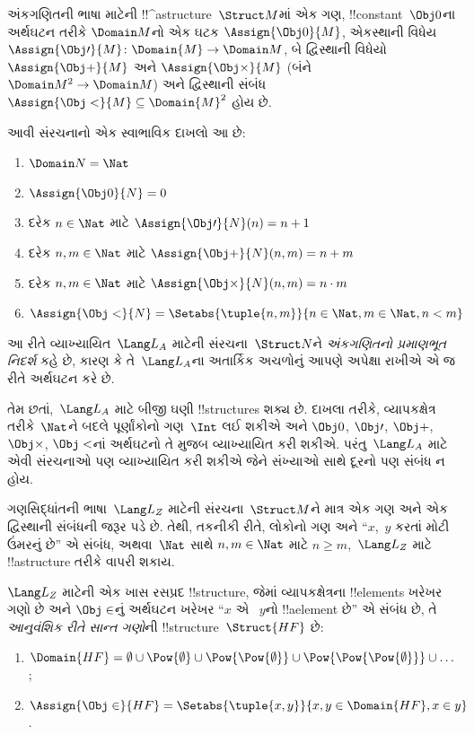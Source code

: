 \documentclass[../../../include/open-logic-section]{subfiles}
\begin{document}
\begin{ex}
અંકગણિતની ભાષા માટેની !!^a{structure}~$\Struct M$માં એક ગણ,
!!{constant}~$\Obj 0$ના અર્થઘટન તરીકે $\Domain M$નો એક ઘટક
$\Assign{\Obj 0}{M}$, એકસ્થાની વિધેય
$\Assign{\Obj \prime}{M} \colon \Domain{M} \to \Domain M$, બે
દ્વિસ્થાની વિધેયો $\Assign{\Obj +}{M}$ અને $\Assign{\Obj
  \times}{M}$ (બંને $\Domain M^2 \to \Domain M$) અને દ્વિસ્થાની
સંબંધ $\Assign{\Obj <}{M} \subseteq \Domain{M}^2$ હોય છે.

આવી સંરચનાનો એક સ્વાભાવિક દાખલો આ છે:
\begin{enumerate}
\item $\Domain N = \Nat$
\item $\Assign{\Obj 0}{N} = 0$
\item દરેક $n \in \Nat$ માટે $\Assign{\Obj \prime}{N}(n) = n + 1$
\item દરેક $n, m \in \Nat$ માટે $\Assign{\Obj +}{N}(n, m) = n + m$
\item દરેક $n, m \in \Nat$ માટે $\Assign{\Obj \times}{N}(n, m) = n\cdot m$
\item $\Assign{\Obj <}{N} = \Setabs{\tuple{n, m}}{n \in \Nat, m \in
  \Nat, n < m}$
\end{enumerate}
આ રીતે વ્યાખ્યાયિત~$\Lang L_A$ માટેની સંરચના~$\Struct N$ને
\emph{અંકગણિતનો પ્રમાણભૂત નિદર્શ} કહે છે, કારણ કે તે~$\Lang L_A$ના
અતાર્કિક અચળોનું આપણે અપેક્ષા રાખીએ એ જ રીતે અર્થઘટન કરે છે.

તેમ છતાં,~$\Lang L_A$ માટે બીજી ઘણી !!{structure}s શક્ય છે. દાખલા
તરીકે, વ્યાપકક્ષેત્ર તરીકે~$\Nat$ને બદલે પૂર્ણાંકોનો ગણ~$\Int$ લઈ શકીએ અને
$\Obj 0$, $\Obj \prime$, $\Obj +$, $\Obj \times$, $\Obj <$નાં
અર્થઘટનો તે મુજબ વ્યાખ્યાયિત કરી શકીએ. પરંતુ~$\Lang L_A$ માટે એવી
સંરચનાઓ પણ વ્યાખ્યાયિત કરી શકીએ જેને સંખ્યાઓ સાથે દૂરનો પણ સંબંધ ન
હોય.
\end{ex}

\begin{ex}
ગણસિદ્ધાંતની ભાષા~$\Lang L_Z$ માટેની સંરચના~$\Struct M$ને માત્ર એક
ગણ અને એક દ્વિસ્થાની સંબંધની જરૂર પડે છે. તેથી, તકનીકી રીતે, લોકોનો
ગણ અને ``$x$,~$y$ કરતાં મોટી ઉંમરનું છે'' એ સંબંધ, અથવા~$\Nat$ સાથે
$n, m \in \Nat$ માટે $n \ge m$,~$\Lang L_Z$ માટે !!a{structure}
તરીકે વાપરી શકાય.

$\Lang L_Z$ માટેની એક ખાસ રસપ્રદ !!{structure}, જેમાં વ્યાપકક્ષેત્રના
!!{element}s ખરેખર ગણો છે અને $\Obj \in$નું અર્થઘટન ખરેખર ``$x$ એ
~$y$નો !!a{element} છે'' એ સંબંધ છે, તે \emph{આનુવંશિક રીતે સાન્ત
ગણો}ની !!{structure}~$\Struct{{HF}}$ છે:
\begin{enumerate}
\item $\Domain{{{HF}}} = \emptyset \cup \Pow{\emptyset} \cup
  \Pow{\Pow{\emptyset}} \cup \Pow{\Pow{\Pow{\emptyset}}} \cup \dots$;
\item $\Assign{\Obj \in}{{{HF}}} = \Setabs{\tuple{x, y}}{x, y \in
  \Domain{{{HF}}}, x \in y}$.
\end{enumerate}
\end{ex}
\end{document}
